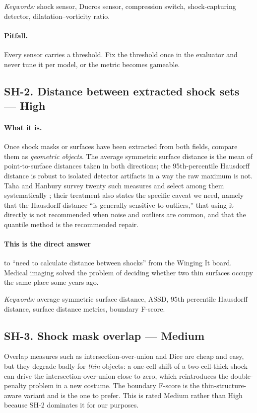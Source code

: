 \documentclass[11pt]{article}
\newcommand{\High}{\textbf{High}}
\newcommand{\Med}{Medium}
\newcommand{\keywords}[1]{\par\smallskip\noindent\textit{Keywords:} #1}
\begin{document}
\keywords{shock sensor, Ducros sensor, compression switch, shock-capturing detector,
dilatation--vorticity ratio.}

\paragraph{Pitfall.} Every sensor carries a threshold. Fix the threshold once in the
evaluator and never tune it per model, or the metric becomes gameable.

\subsection{SH-2. Distance between extracted shock sets --- \High{}}

\paragraph{What it is.} Once shock masks or surfaces have been extracted from both fields,
compare them as \emph{geometric objects}. The average symmetric surface distance is the
mean of point-to-surface distances taken in both directions; the 95th-percentile Hausdorff
distance is robust to isolated detector artifacts in a way the raw maximum is not. Taha and
Hanbury survey twenty such measures and select among them systematically
\cite{taha2015}; their treatment also states the specific caveat we need, namely that the
Hausdorff distance ``is generally sensitive to outliers,'' that using it directly is not
recommended when noise and outliers are common, and that the quantile method is the
recommended repair.

\paragraph{This is the direct answer} to ``need to calculate distance between shocks'' from
the Winging It board. Medical imaging solved the problem of deciding whether two thin
surfaces occupy the same place some years ago.

\keywords{average symmetric surface distance, ASSD, 95th percentile Hausdorff distance,
surface distance metrics, boundary F-score.}

\subsection{SH-3. Shock mask overlap --- \Med{}}

Overlap measures such as intersection-over-union and Dice are cheap and easy, but they
degrade badly for \emph{thin} objects: a one-cell shift of a two-cell-thick shock can drive
the intersection-over-union close to zero, which reintroduces the double-penalty problem in
a new costume. The boundary F-score is the thin-structure-aware variant and is the one to
prefer. This is rated Medium rather than High because SH-2 dominates it for our purposes.
\end{document}
